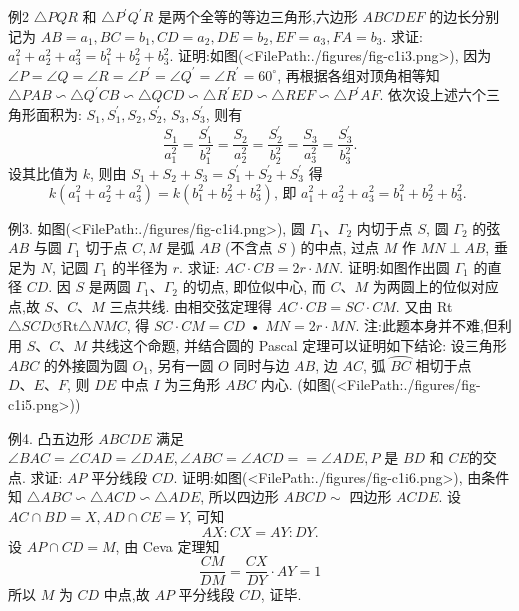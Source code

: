 例2 $\triangle P Q R$ 和 $\triangle P^{\prime} Q^{\prime} R$ 是两个全等的等边三角形,六边形 $A B C D E F$ 的边长分别记为 $A B=a_1, B C=b_1, C D=a_2, D E=b_2, E F=a_3, F A=b_3$. 求证: $a_1^2+a_2^2+a_3^2=b_1^2+b_2^2+b_3^2$.
证明:如图(<FilePath:./figures/fig-c1i3.png>), 因为 $\angle P=\angle Q=\angle R= \angle P^{\prime}=\angle Q^{\prime}=\angle R^{\prime}=60^{\circ}$, 再根据各组对顶角相等知
$\triangle P A B \backsim \triangle Q^{\prime} C B \backsim \triangle Q C D \backsim \triangle R^{\prime} E D \backsim \triangle R E F \backsim \triangle P^{\prime} A F$.
依次设上述六个三角形面积为: $S_1, S_1^{\prime}, S_2, S_2^{\prime}$, $S_3, S_3^{\prime}$, 则有
$$
\frac{S_1}{a_1^2}=\frac{S_1^{\prime}}{b_1^2}=\frac{S_2}{a_2^2}=\frac{S_2^{\prime}}{b_2^2}=\frac{S_3}{a_3^2}=\frac{S_3^{\prime}}{b_3^2} .
$$
设其比值为 $k$, 则由 $S_1+S_2+S_3=S_1^{\prime}+S_2^{\prime}+S_3^{\prime}$ 得
$$
k\left(a_1^2+a_2^2+a_3^2\right)=k\left(b_1^2+b_2^2+b_3^2\right) \text {, 即 } a_1^2+a_2^2+a_3^2=b_1^2+b_2^2+b_3^2 \text {. }
$$



例3. 如图(<FilePath:./figures/fig-c1i4.png>), 圆 $\Gamma_1 、 \Gamma_2$ 内切于点 $S$, 圆 $\Gamma_2$ 的弦 $A B$ 与圆 $\Gamma_1$ 切于点 $C, M$ 是弧 $A B$ (不含点 $S$ ) 的中点, 过点 $M$ 作 $M N \perp A B$, 垂足为 $N$, 记圆 $\Gamma_1$ 的半径为 $r$.
求证: $A C \cdot C B=2 r \cdot M N$. 
证明:如图作出圆 $\Gamma_1$ 的直径 $C D$.
因 $S$ 是两圆 $\Gamma_1 、 \Gamma_2$ 的切点, 即位似中心, 而 $C 、 M$ 为两圆上的位似对应点,故 $S 、 C 、 M$ 三点共线.
由相交弦定理得 $A C \cdot C B=S C \cdot C M$.
又由 Rt $\triangle S C D \circlearrowleft \mathrm{Rt} \triangle N M C$, 得 $S C \cdot C M=C D$ • $M N=2 r \cdot M N$.
注:此题本身并不难,但利用 $S 、 C 、 M$ 共线这个命题, 并结合圆的 Pascal 定理可以证明如下结论:
设三角形 $A B C$ 的外接圆为圆 $O_1$, 另有一圆 $O$ 同时与边 $A B$, 边 $A C$, 弧 $\overparen{B C}$ 相切于点 $D 、 E 、 F$, 则 $D E$ 中点 $I$ 为三角形 $A B C$ 内心.
(如图(<FilePath:./figures/fig-c1i5.png>))



例4. 凸五边形 $A B C D E$ 满足 $\angle B A C=\angle C A D= \angle D A E, \angle A B C=\angle A C D==\angle A D E, P$ 是 $B D$ 和 $C E$的交点.
求证: $A P$ 平分线段 $C D$.
证明:如图(<FilePath:./figures/fig-c1i6.png>), 由条件知 $\triangle A B C \backsim \triangle A C D \backsim \triangle A D E$, 所以四边形 $A B C D \sim$ 四边形 $A C D E$.
设 $A C \cap B D=X, A D \cap C E=Y$, 可知
$$
A X: C X=A Y: D Y .
$$
设 $A P \cap C D=M$, 由 Ceva 定理知
$$
\frac{C M}{D M}=\frac{C X}{D Y} \cdot A Y=1 
$$
所以 $M$ 为 $C D$ 中点,故 $A P$ 平分线段 $C D$, 证毕.



